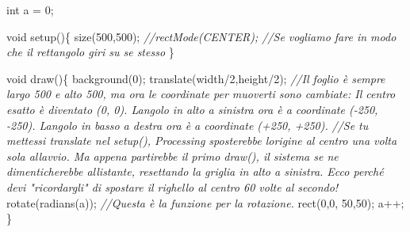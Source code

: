 \documentclass[
]{article}
\newenvironment{Shaded}{}{}
\newcommand{\CommentTok}[1]{\textcolor[rgb]{0.38,0.63,0.69}{\textit{#1}}}
\newcommand{\DataTypeTok}[1]{\textcolor[rgb]{0.56,0.13,0.00}{#1}}
\newcommand{\DecValTok}[1]{\textcolor[rgb]{0.25,0.63,0.44}{#1}}
\newcommand{\FunctionTok}[1]{\textcolor[rgb]{0.02,0.16,0.49}{#1}}
\newcommand{\NormalTok}[1]{#1}
\newcommand{\OperatorTok}[1]{\textcolor[rgb]{0.40,0.40,0.40}{#1}}
\begin{document}
\begin{Shaded}
\begin{Highlighting}[]
\DataTypeTok{int}\NormalTok{ a }\OperatorTok{=} \DecValTok{0}\OperatorTok{;}

\DataTypeTok{void} \FunctionTok{setup}\OperatorTok{()\{}
  \FunctionTok{size}\OperatorTok{(}\DecValTok{500}\OperatorTok{,}\DecValTok{500}\OperatorTok{);}
    \CommentTok{//rectMode(CENTER); //Se vogliamo fare in modo che il rettangolo giri su se stesso}
\OperatorTok{\}}

\DataTypeTok{void} \FunctionTok{draw}\OperatorTok{()\{}
  \FunctionTok{background}\OperatorTok{(}\DecValTok{0}\OperatorTok{);}
  \FunctionTok{translate}\OperatorTok{(}\NormalTok{width}\OperatorTok{/}\DecValTok{2}\OperatorTok{,}\NormalTok{height}\OperatorTok{/}\DecValTok{2}\OperatorTok{);}
  \CommentTok{//Il foglio è sempre largo 500 e alto 500, ma ora le coordinate per muoverti sono cambiate: Il centro esatto è diventato (0, 0). L\textquotesingle{}angolo in alto a sinistra ora è a coordinate ({-}250, {-}250). L\textquotesingle{}angolo in basso a destra ora è a coordinate (+250, +250).}
  \CommentTok{//Se tu mettessi translate nel setup(), Processing sposterebbe l\textquotesingle{}origine al centro una volta sola all\textquotesingle{}avvio. Ma appena partirebbe il primo draw(), il sistema se ne dimenticherebbe all\textquotesingle{}istante, resettando la griglia in alto a sinistra. Ecco perché devi "ricordargli" di spostare il righello al centro 60 volte al secondo!}
  \FunctionTok{rotate}\OperatorTok{(}\FunctionTok{radians}\OperatorTok{(}\NormalTok{a}\OperatorTok{));} \CommentTok{//Questa è la funzione per la rotazione.}
  \FunctionTok{rect}\OperatorTok{(}\DecValTok{0}\OperatorTok{,}\DecValTok{0}\OperatorTok{,} \DecValTok{50}\OperatorTok{,}\DecValTok{50}\OperatorTok{);}
\NormalTok{  a}\OperatorTok{++;}
\OperatorTok{\}}
\end{Highlighting}
\end{Shaded}
\end{document}
